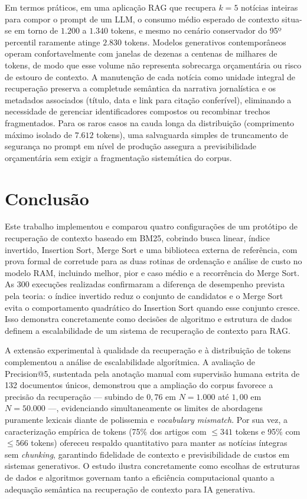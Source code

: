 \documentclass[12pt, a4paper]{article}
\begin{document}
Em termos práticos, em uma aplicação RAG que recupera $k=5$ notícias inteiras para compor o prompt de um LLM, o consumo médio esperado de contexto situa-se em torno de $1.200$ a $1.340$ tokens, e mesmo no cenário conservador do 95º percentil raramente atinge $2.830$ tokens. Modelos generativos contemporâneos operam confortavelmente com janelas de dezenas a centenas de milhares de tokens, de modo que esse volume não representa sobrecarga orçamentária ou risco de estouro de contexto. A manutenção de cada notícia como unidade integral de recuperação preserva a completude semântica da narrativa jornalística e os metadados associados (título, data e link para citação conferível), eliminando a necessidade de gerenciar identificadores compostos ou recombinar trechos fragmentados. Para os raros casos na cauda longa da distribuição (comprimento máximo isolado de $7.612$ tokens), uma salvaguarda simples de truncamento de segurança no prompt em nível de produção assegura a previsibilidade orçamentária sem exigir a fragmentação sistemática do corpus.

\section{Conclusão}

Este trabalho implementou e comparou quatro configurações de um protótipo de recuperação de contexto baseado em BM25, cobrindo busca linear, índice invertido, Insertion Sort, Merge Sort e uma biblioteca externa de referência, com prova formal de corretude para as duas rotinas de ordenação e análise de custo no modelo RAM, incluindo melhor, pior e caso médio e a recorrência do Merge Sort. As 300 execuções realizadas confirmaram a diferença de desempenho prevista pela teoria: o índice invertido reduz o conjunto de candidatos e o Merge Sort evita o comportamento quadrático do Insertion Sort quando esse conjunto cresce. Isso demonstra concretamente como decisões de algoritmo e estrutura de dados definem a escalabilidade de um sistema de recuperação de contexto para RAG.

A extensão experimental à qualidade da recuperação e à distribuição de tokens complementou a análise de escalabilidade algorítmica. A avaliação de Precision@5, sustentada pela anotação manual com supervisão humana estrita de 132 documentos únicos, demonstrou que a ampliação do corpus favorece a precisão da recuperação — subindo de $0{,}76$ em $N=1.000$ até $1{,}00$ em $N=50.000$ —, evidenciando simultaneamente os limites de abordagens puramente lexicais diante de polissemia e \textit{vocabulary mismatch}. Por sua vez, a caracterização empírica de tokens (75\% dos artigos com $\le 341$ tokens e 95\% com $\le 566$ tokens) ofereceu respaldo quantitativo para manter as notícias íntegras sem \textit{chunking}, garantindo fidelidade de contexto e previsibilidade de custos em sistemas generativos. O estudo ilustra concretamente como escolhas de estruturas de dados e algoritmos governam tanto a eficiência computacional quanto a adequação semântica na recuperação de contexto para IA generativa.
\end{document}
